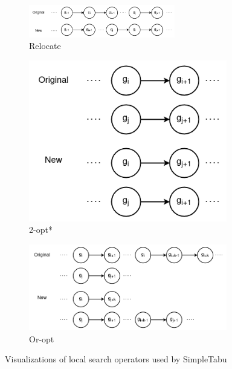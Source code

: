\documentclass[12pt]{report}
\begin{document}
\begin{figure}[ht]
	\centering
	\begin{subfigure}[b]{\linewidth}
		\centering
		\includegraphics[width=0.7\textwidth]{images/lsops-relocate.png}
		\caption{Relocate}
	\end{subfigure}
	\begin{subfigure}[b]{0.35\linewidth}
		\centering
		\includegraphics[width=0.95\textwidth]{images/lsops-2-opt.png}
		\caption{2-opt*}
	\end{subfigure}
	\begin{subfigure}[b]{0.63\linewidth}
		\centering
		\includegraphics[width=0.95\textwidth]{images/lsops-or-opt.png}
		\caption{Or-opt}
	\end{subfigure}
	\caption{Visualizations of local search operators used by SimpleTabu}
	\label{fig:operators}
\end{figure}
\end{document}
